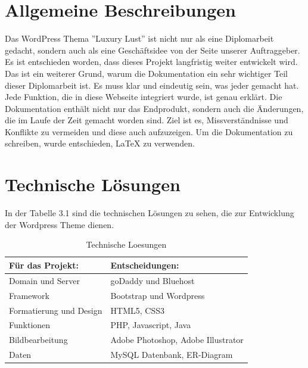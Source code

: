 \section{Allgemeine Beschreibungen}
Das WordPress Thema ''Luxury Lust'' ist nicht nur als eine Diplomarbeit gedacht, sondern auch als eine Geschäftsidee von der Seite unserer Auftraggeber. Es ist entschieden worden, dass dieses Projekt langfristig
weiter entwickelt wird.
Das ist ein weiterer Grund, warum die Dokumentation ein sehr wichtiger
Teil dieser Diplomarbeit ist. Es muss klar und eindeutig sein, was jeder
gemacht hat. Jede Funktion, die in diese Webseite integriert wurde, ist
genau erklärt.
Die Dokumentation enthält nicht nur das Endprodukt, sondern auch die
\"Anderungen, die im Laufe der Zeit gemacht worden sind. Ziel ist es, Missverständnisse und Konflikte zu vermeiden und diese auch aufzuzeigen.
Um die Dokumentation zu schreiben, wurde entschieden, LaTeX zu
verwenden.

\section{Technische L\"osungen}
In der Tabelle 3.1 sind die technischen Lösungen zu sehen, die zur Entwicklung der Wordpress Theme dienen.

\begin{table}
\begin{center}
\begin{tabular}{ |l|l| } 
 \hline
  \textbf{F\"ur das Projekt:} & \textbf{Entscheidungen:} \\ 
 \hline
 Domain und Server & goDaddy und Bluehost \\
 \hline
 Framework & Bootstrap und Wordpress  \\
 \hline
 Formatierung und Design & HTML5, CSS3 \\
 \hline
 Funktionen & PHP, Javascript, Java \\
 \hline
 Bildbearbeitung & Adobe Photoshop, Adobe Illustrator \\
 \hline
 Daten & MySQL Datenbank, ER-Diagram \\
\hline
\end{tabular}
\end{center}
\caption{Technische Loesungen}
\end{table}

\newpage
